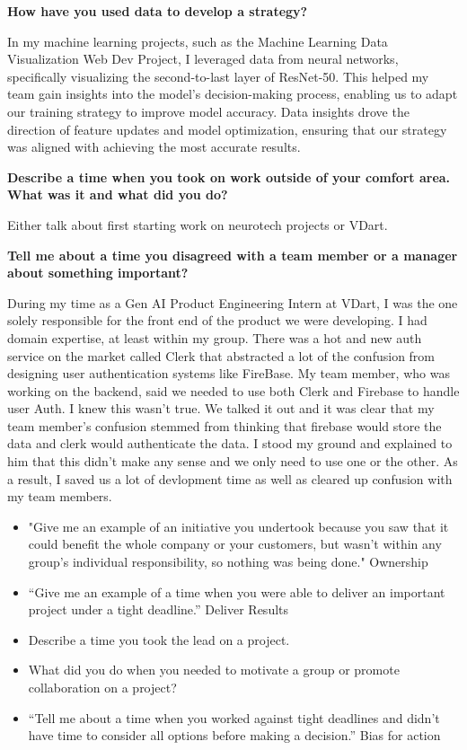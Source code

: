 \documentclass{article}
\begin{document}
\textbf{How have you used data to develop a strategy?}

In my machine learning projects, such as the Machine Learning Data Visualization Web Dev Project, I leveraged data from neural networks, specifically visualizing the second-to-last layer of ResNet-50. This helped my team gain insights into the model's decision-making process, enabling us to adapt our training strategy to improve model accuracy. Data insights drove the direction of feature updates and model optimization, ensuring that our strategy was aligned with achieving the most accurate results. \newline

\textbf{Describe a time when you took on work outside of your comfort area. What was it and what did you do?} 

Either talk about first starting work on neurotech projects or VDart. \newline

\textbf{Tell me about a time you disagreed with a team member or a manager about something important?}

During my time as a Gen AI Product Engineering Intern at VDart, I was the one solely responsible for the front end of the product we were developing. I had domain expertise, at least within my group. There was a hot and new auth service on the market called Clerk that abstracted a lot of the confusion from designing user authentication systems like FireBase. My team member, who was working on the backend, said we needed to use both Clerk and Firebase to handle user Auth. I knew this wasn't true. We talked it out and it was clear that my team member's confusion stemmed from thinking that firebase would store the data and clerk would authenticate the data. I stood my ground and explained to him that this didn't make any sense and we only need to use one or the other. As a result, I saved us a lot of devlopment time as well as cleared up confusion with my team members. \newline
\begin{itemize}
\item "Give me an example of an initiative you undertook because you saw that it could benefit the whole company or your customers, but wasn’t within any group’s individual responsibility, so nothing was being done." Ownership
\item “Give me an example of a time when you were able to deliver an important project under a tight deadline.” Deliver Results
\item Describe a time you took the lead on a project.
\item What did you do when you needed to motivate a group or promote collaboration on a project?
\item “Tell me about a time when you worked against tight deadlines and didn't have time to consider all options before making a decision.” Bias for action
\end{itemize}
\end{document}
